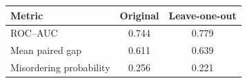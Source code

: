 \begin{tabular}{lcc}
\toprule
Metric & Original & Leave-one-out \\
\midrule
ROC--AUC & 0.744 & 0.779 \\
Mean paired gap & 0.611 & 0.639 \\
Misordering probability & 0.256 & 0.221 \\
\bottomrule
\end{tabular}
